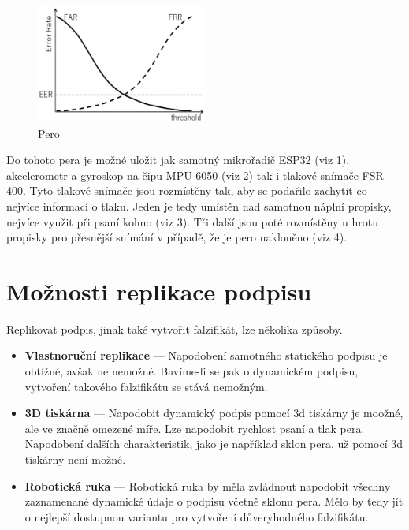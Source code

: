 \begin{figure}[h]
  \centering
  \includegraphics[width=0.5\textwidth]{obrazky-figures/FAR_FRR.png}
  \caption{Pero} 
  \label{fig:pero}
\end{figure}

Do tohoto pera je možné uložit jak samotný mikrořadič ESP32 (viz 1), akcelerometr a gyroskop na čipu MPU-6050 (viz 2) tak i tlakové snímače FSR-400.
Tyto tlakové snímače jsou rozmístěny tak, aby se podařilo zachytit co nejvíce informací o tlaku.
Jeden je tedy umístěn nad samotnou náplní propisky, nejvíce využit při psaní kolmo (viz 3).
Tři další jsou poté rozmístěny u hrotu propisky pro přesnější snímání v případě, že je pero nakloněno (viz 4). 


\section{Možnosti replikace podpisu}
Replikovat podpis, jinak také vytvořit falzifikát, lze několika způsoby.

\begin{itemize}
  \item \textbf{Vlastnoruční replikace} --- 
  Napodobení samotného statického podpisu je obtížné, avšak ne nemožné. 
  Bavíme-li se pak o dynamickém podpisu, vytvoření takového falzifikátu se stává nemožným.

  \item \textbf{3D tiskárna} ---
  Napodobit dynamický podpis pomocí 3d tiskárny je moožné, ale ve značně omezené míře.
  Lze napodobit rychlost psaní a tlak pera. 
  Napodobení dalších charakteristik, jako je například sklon pera, už pomocí 3d tiskárny není možné. 

  \item \textbf{Robotická ruka} ---
  Robotická ruka by měla zvládnout napodobit všechny zaznamenané dynamické údaje o podpisu včetně sklonu pera.
  Mělo by tedy jít o nejlepší dostupnou variantu pro vytvoření důveryhodného falzifikátu. 
\end{itemize}



